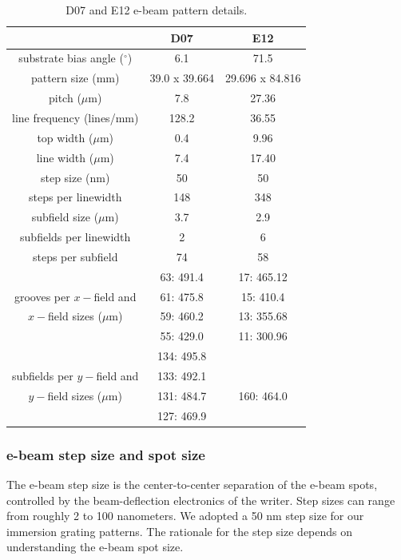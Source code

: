 \documentclass[]{spie}  %
\begin{document}
\begin{table}
	\begin{center}
	\caption{D07 and E12 e-beam pattern details. \label{tab:D07andE12}}
	\begin{tabular}{ccc}
	\toprule
	   &D07 & E12  \\
	\midrule
	substrate bias angle ($^\circ$) & 6.1 & 71.5 \\
	pattern size (mm) & 39.0 x 39.664 & 29.696 x 84.816 \\
	pitch ($\mu$m) & 7.8 & 27.36 \\
	line frequency (lines/mm) & 128.2 & 36.55 \\
	top width ($\mu$m) & 0.4 & 9.96 \\
	line width ($\mu$m) & 7.4 & 17.40 \\
	step size (nm) & 50 & 50 \\
	steps per linewidth & 148 & 348 \\
	subfield size ($\mu$m) & 3.7 & 2.9 \\
	subfields per linewidth & 2 & 6 \\
	steps per subfield & 74 & 58 \\
	\cline{1-1}
	 			      & 63: 491.4  & 17: 465.12 \\
	grooves per $x-$field and & 61: 475.8 & 15: 410.4 \\
	$x-$field sizes ($\mu$m) & 59: 460.2 & 13: 355.68 \\
	 				        & 55: 429.0 & 11: 300.96 \\
	\cline{1-1}					        
	 			      & 134: 495.8  &   \\
	subfields per $y-$field and & 133: 492.1 &   \\
	$y-$field sizes ($\mu$m) & 131: 484.7 & 160: 464.0 \\
	 				        & 127: 469.9 &   \\	
	\cline{1-1}
	\bottomrule
	\end{tabular}
	\end{center}
\end{table}	


\subsubsection{e-beam step size and spot size}
The e-beam step size is the center-to-center separation of the e-beam spots, controlled by the beam-deflection electronics of the writer.  Step sizes can range from roughly 2 to 100 nanometers.  We adopted a 50 nm step size for our immersion grating patterns.  The rationale for the step size depends on understanding the e-beam spot size.  
\end{document}
